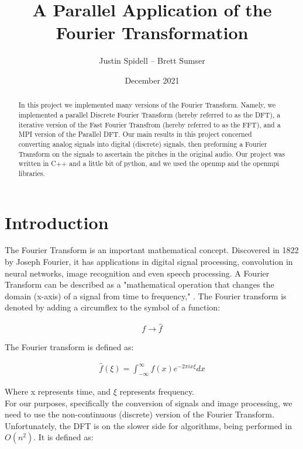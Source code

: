 \documentclass[12pt]{extarticle}
\title{A Parallel Application of the Fourier Transformation}
\author{Justin Spidell -- Brett Sumser}
\date{December 2021}
\begin{document}
\maketitle
\newpage

\begin{abstract}
\normalsize %
	In this project we implemented many versions of the Fourier Transform. 
	Namely, we implemented a parallel Discrete Fourier Transform (hereby referred to as the DFT), a iterative version of the Fast Fourier Transfrom (hereby referred to as the FFT), and a MPI version of the Parallel DFT. 
	Our main results in this project concerned converting analog signals into digital (discrete) signals, then preforming a Fourier Transform on the signals to ascertain the pitches in the original audio.
    Our project was written in C++ and a little bit of python, and we used the openmp and the openmpi libraries.
\end{abstract}

\newpage
\section*{Introduction}

	The Fourier Transform is an important mathematical concept.	
	Discovered in 1822 by Joseph Fourier, it has applications in digital signal processing, convolution in neural networks, image recognition and even speech processing.
    A Fourier Transform can be described as a "mathematical operation that changes the domain (x-axis) of a signal from time to frequency," \cite{Maklin:2019}. 
    The Fourier transform is denoted by adding a circumflex to the symbol of a function:

	\begin{align*}
		f \rightarrow \hat{f}
	\end{align*}

	The Fourier transform is defined as:

	\begin{align}
		\hat{f} (\xi)= \int^{\infty}_{-\infty}f(x) e^{-2 \pi i x \xi}dx
	\end{align}
	
	Where x represents time, and $\xi$ represents frequency.
	\\

    For our purposes, specifically the conversion of signals and image processing, we need to use the non-continuous (discrete) version of the Fourier Transform.
    Unfortunately, the DFT is on the slower side for algorithms, being performed in $O(n^2)$.
    It is defined as:
    
\end{document}
